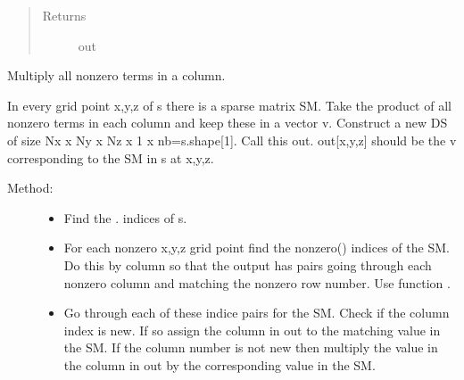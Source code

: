 \documentclass[letterpaper,10pt,english]{sphinxmanual}
\begin{document}
\begin{fulllineitems}
\begin{fulllineitems}
\begin{quote}
\begin{description}
\item[{Returns}] \leavevmode
out

\end{description}\end{quote}

\end{fulllineitems}


\begin{fulllineitems}
\label{\detokenize{index:DictionarySparseMatrix.DS.dict_col_mult_}}
Multiply all nonzero terms in a column.

In every grid point x,y,z of s there is a sparse matrix SM.     Take the product of all nonzero terms in each column and     keep these in a vector v.
Construct a new DS of size Nx x Ny x Nz x 1 x nb=s.shape{[}1{]}.    Call this out. out{[}x,y,z{]} should be the v corresponding     to the SM in s at x,y,z.
\begin{description}
\item[{Method:}] \leavevmode\begin{itemize}
\item {} 
Find the {\hyperref[\detokenize{index:DictionarySparseMatrix.DS}]{}}. {\hyperref[\detokenize{index:DictionarySparseMatrix.DS.nonzero}]{}} indices of s.

\item {} 
For each nonzero x,y,z grid point find the       nonzero() indices of the SM. Do this by column so       that the output has pairs going through       each nonzero column and matching the nonzero row       number. Use function {\hyperref[\detokenize{index:DictionarySparseMatrix.nonzero_bycol}]{}}.

\item {} 
Go through each of these indice pairs for the SM.       Check if the column index is new. If so assign       the column in out to the matching       value in the SM. If the column number is not       new then multiply the value in the column in       out by the corresponding value in the SM.

\end{itemize}


\end{description}
\end{fulllineitems}
\end{fulllineitems}
\end{document}
